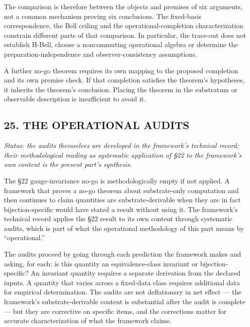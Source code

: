 \documentclass[
]{article}
\begin{document}
The comparison is therefore between the objects and premises of six
arguments, not a common mechanism proving six conclusions. The
fixed-basis correspondence, the Bell ceiling and the
operational-completion characterization constrain different parts of
that comparison. In particular, the trace-out does not establish H-Bell,
choose a noncommuting operational algebra or determine the
preparation-independence and observer-consistency assumptions.

A further no-go theorem requires its own mapping to the proposed
completion and its own premise check. If that completion satisfies the
theorem's hypotheses, it inherits the theorem's conclusion. Placing the
theorem in the substratum or observable description is insufficient to
avoid it.

\hypertarget{the-operational-audits}{%
\subsection{25. THE OPERATIONAL AUDITS}\label{the-operational-audits}}

\emph{Status: the audits themselves are developed in the framework's
technical record; their methodological reading as systematic application
of §22 to the framework's own content is the present part's synthesis.}

The §22 gauge-invariance no-go is methodologically empty if not applied.
A framework that proves a no-go theorem about substrate-only computation
and then continues to claim quantities are substrate-derivable when they
are in fact bijection-specific would have stated a result without using
it. The framework's technical record applies the §22 result to its own
content through systematic audits, which is part of what the operational
methodology of this part means by ``operational.''

The audits proceed by going through each prediction the framework makes
and asking, for each: is this quantity an equivalence-class invariant or
bijection-specific? An invariant quantity requires a separate derivation
from the declared inputs. A quantity that varies across a fixed-data
class requires additional data for empirical determination. The audits
are not deflationary in net effect --- the framework's
substrate-derivable content is substantial after the audit is complete
--- but they are corrective on specific items, and the corrections
matter for accurate characterization of what the framework claims.
\end{document}
